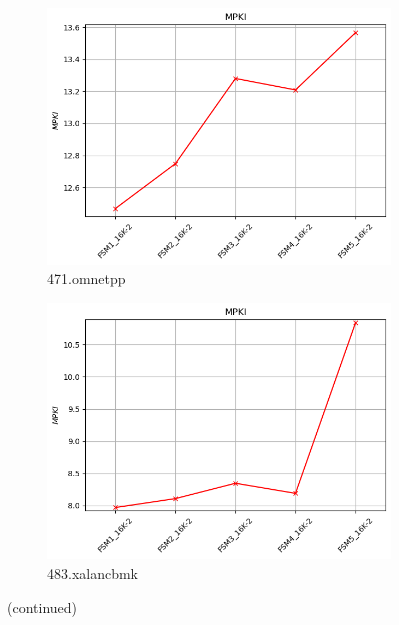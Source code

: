 \documentclass{article}
\begin{document}
\begin{figure}[H]
     \vspace{0.5cm} %
 
     \begin{subfigure}[b]{0.45\textwidth}
         \includegraphics[width=\textwidth]{figures/5_3_b/471.omnetpp.cslab_branch_preds_ref.out.png}
         \caption{471.omnetpp}
         \label{fig:plot31}
     \end{subfigure}
     \hfill
     \begin{subfigure}[b]{0.45\textwidth}
         \includegraphics[width=\textwidth]{figures/5_3_b/483.xalancbmk.cslab_branch_preds_ref.out.png}
         \caption{483.xalancbmk}
         \label{fig:plot32}
     \end{subfigure}
 
     \vspace{0.5cm} 
 
     \caption{(continued)}
     \label{fig:fsm_part3}
 \end{figure}
\end{document}
